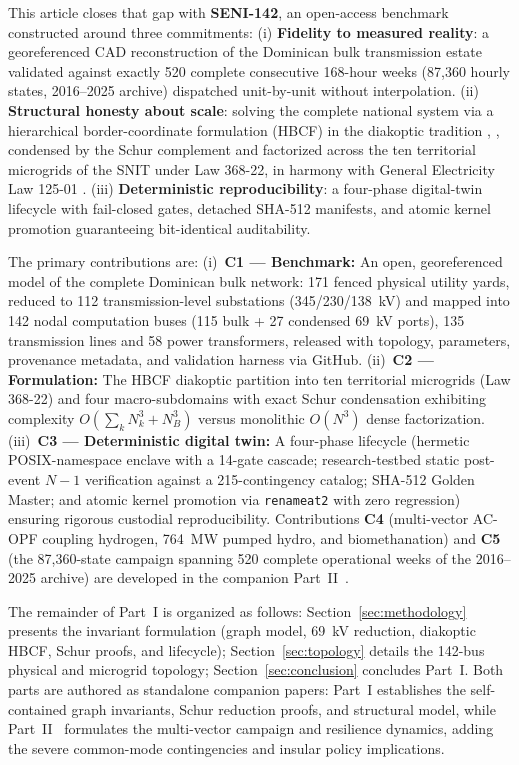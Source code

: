 This article closes that gap with \textbf{SENI-142}, an open-access benchmark constructed around three commitments: (i) \textbf{Fidelity to measured reality}: a georeferenced CAD reconstruction of the Dominican bulk transmission estate validated against exactly 520 complete consecutive 168-hour weeks (87,360 hourly states, 2016--2025 archive) dispatched unit-by-unit without interpolation. (ii) \textbf{Structural honesty about scale}: solving the complete national system via a hierarchical border-coordinate formulation (HBCF) in the diakoptic tradition \cite{kron1963}, \cite{happ1971}, condensed by the Schur complement \cite{zhang2005} and factorized across the ten territorial microgrids of the SNIT under Law 368-22, in harmony with General Electricity Law 125-01 \cite{ley368}. (iii) \textbf{Deterministic reproducibility}: a four-phase digital-twin lifecycle with fail-closed gates, detached SHA-512 manifests, and atomic kernel promotion guaranteeing bit-identical auditability.

The primary contributions are:
(i)~\textbf{C1 --- Benchmark:} An open, georeferenced model of the complete Dominican bulk network: 171 fenced physical utility yards, reduced to 112 transmission-level substations (345/230/138~kV) and mapped into 142 nodal computation buses (115 bulk + 27 condensed 69~kV ports), 135 transmission lines and 58 power transformers, released with topology, parameters, provenance metadata, and validation harness via GitHub.
(ii)~\textbf{C2 --- Formulation:} The HBCF diakoptic partition into ten territorial microgrids (Law 368-22) and four macro-subdomains with exact Schur condensation exhibiting complexity $O(\sum_k N_k^3 + N_B^3)$ versus monolithic $O(N^3)$ dense factorization.
(iii)~\textbf{C3 --- Deterministic digital twin:} A four-phase lifecycle (hermetic POSIX-namespace enclave with a 14-gate cascade; research-testbed static post-event $N-1$ verification against a 215-contingency catalog; SHA-512 Golden Master; and atomic kernel promotion via \texttt{renameat2} with zero regression) ensuring rigorous custodial reproducibility.
Contributions \textbf{C4} (multi-vector AC-OPF coupling hydrogen, 764~MW pumped hydro, and biomethanation) and \textbf{C5} (the 87,360-state campaign spanning 520 complete operational weeks of the 2016--2025 archive) are developed in the companion Part~II~\cite{seni142part2}.

The remainder of Part~I is organized as follows: Section~\ref{sec:methodology} presents the invariant formulation (graph model, 69~kV reduction, diakoptic HBCF, Schur proofs, and lifecycle); Section~\ref{sec:topology} details the 142-bus physical and microgrid topology; Section~\ref{sec:conclusion} concludes Part~I. Both parts are authored as standalone companion papers: Part~I establishes the self-contained graph invariants, Schur reduction proofs, and structural model, while Part~II~\cite{seni142part2} formulates the multi-vector campaign and resilience dynamics, adding the severe common-mode contingencies and insular policy implications.
